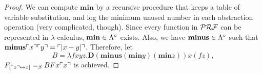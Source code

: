 \begin{proof}
We can compute $\mathbf{min}$ by a recursive procedure that keeps a table of variable substitution,
 and log the minimum unused number in each abstraction operation (very complicated, though).
 Since every function in $\mathcal{PRF}$ can be represented in $\lambda$-calculus,
 $\mathbf{min}\in\Lambda^\circ$ exists.
 Also, we have $\mathbf{minus}\in\Lambda^\circ$ such that 
 $\mathbf{minus}\ulcorner{x}\urcorner\ulcorner{y}\urcorner = 
 \ulcorner{|x-y|}\urcorner$. Therefore, let
\[
 B = \lambda fxyz. \mathbf{D}(\mathbf{minus} (\mathbf{min}y) (\mathbf{min}z))x(fz),
\]
$F_{[\ulcorner{x}\urcorner\mapsto x]} =_{\beta} BFx\ulcorner{x}\urcorner$
is achieved. 



\end{proof}
